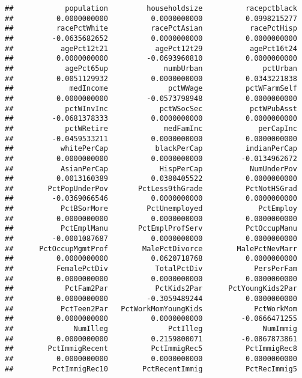 \documentclass[
]{article}
\begin{document}
\begin{verbatim}
##            population         householdsize          racepctblack 
##          0.0000000000          0.0000000000          0.0998215277 
##          racePctWhite          racePctAsian           racePctHisp 
##         -0.0635682652          0.0000000000          0.0000000000 
##           agePct12t21           agePct12t29           agePct16t24 
##          0.0000000000         -0.0693960810          0.0000000000 
##            agePct65up             numbUrban              pctUrban 
##          0.0051129932          0.0000000000          0.0343221838 
##             medIncome              pctWWage          pctWFarmSelf 
##          0.0000000000         -0.0573798948          0.0000000000 
##            pctWInvInc            pctWSocSec           pctWPubAsst 
##         -0.0681378333          0.0000000000          0.0000000000 
##            pctWRetire             medFamInc             perCapInc 
##         -0.0459533211          0.0000000000          0.0000000000 
##           whitePerCap           blackPerCap          indianPerCap 
##          0.0000000000          0.0000000000         -0.0134962672 
##           AsianPerCap            HispPerCap           NumUnderPov 
##          0.0013160389          0.0380405522          0.0000000000 
##        PctPopUnderPov       PctLess9thGrade          PctNotHSGrad 
##         -0.0369066546          0.0000000000          0.0000000000 
##           PctBSorMore         PctUnemployed             PctEmploy 
##          0.0000000000          0.0000000000          0.0000000000 
##           PctEmplManu       PctEmplProfServ          PctOccupManu 
##         -0.0001087687          0.0000000000          0.0000000000 
##      PctOccupMgmtProf        MalePctDivorce        MalePctNevMarr 
##          0.0000000000          0.0620718768          0.0000000000 
##          FemalePctDiv           TotalPctDiv            PersPerFam 
##          0.0000000000          0.0000000000          0.0000000000 
##            PctFam2Par           PctKids2Par      PctYoungKids2Par 
##          0.0000000000         -0.3059489244          0.0000000000 
##           PctTeen2Par   PctWorkMomYoungKids            PctWorkMom 
##          0.0000000000          0.0000000000         -0.0666471255 
##              NumIlleg              PctIlleg              NumImmig 
##          0.0000000000          0.2159800071         -0.0867873861 
##        PctImmigRecent          PctImmigRec5          PctImmigRec8 
##          0.0000000000          0.0000000000          0.0000000000 
##         PctImmigRec10        PctRecentImmig          PctRecImmig5 

\end{verbatim}
\end{document}

